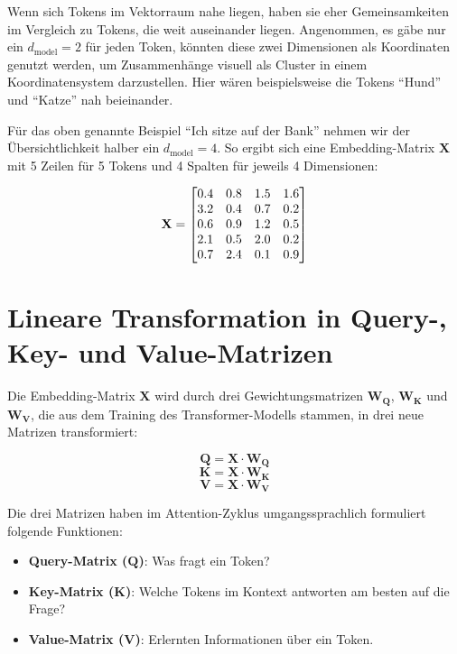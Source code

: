 Wenn sich Tokens im Vektorraum nahe liegen, haben sie eher Gemeinsamkeiten im Vergleich zu Tokens, die weit auseinander liegen.  
Angenommen, es gäbe nur ein \( d_{\text{model}} = 2 \) für jeden Token, könnten diese zwei Dimensionen als Koordinaten genutzt werden, um Zusammenhänge visuell als Cluster in einem Koordinatensystem darzustellen.  
Hier wären beispielsweise die Tokens \enquote{Hund} und \enquote{Katze} nah beieinander.

Für das oben genannte Beispiel \enquote{Ich sitze auf der Bank} nehmen wir der Übersichtlichkeit halber ein \( d_{\text{model}} = 4 \).  
So ergibt sich eine Embedding-Matrix $\mathbf{X}$ mit 5 Zeilen für 5 Tokens und 4 Spalten für jeweils 4 Dimensionen:

\[
\centering
\mathbf{X} =
\begin{bmatrix}
0.4 & 0.8 & 1.5 & 1.6 \\
3.2 & 0.4 & 0.7 & 0.2 \\
0.6 & 0.9 & 1.2 & 0.5 \\
2.1 & 0.5 & 2.0 & 0.2 \\
0.7 & 2.4 & 0.1 & 0.9
\end{bmatrix}
\]

\section{Lineare Transformation in Query-, Key- und Value-Matrizen}

Die Embedding-Matrix $\mathbf{X}$ wird durch drei Gewichtungsmatrizen $\mathbf{W_Q}$, $\mathbf{W_K}$ und $\mathbf{W_V}$, die aus dem Training des Transformer-Modells stammen, in drei neue Matrizen transformiert:

\[
\mathbf{Q} = \mathbf{X} \cdot \mathbf{W_Q}
\]
\[
\mathbf{K} = \mathbf{X} \cdot \mathbf{W_K}
\]
\[
\mathbf{V} = \mathbf{X} \cdot \mathbf{W_V}
\]

Die drei Matrizen haben im Attention-Zyklus umgangssprachlich formuliert folgende Funktionen:

\begin{itemize}
    \item \textbf{Query-Matrix (\(\mathbf{Q}\))}: Was fragt ein Token?
    \item \textbf{Key-Matrix (\(\mathbf{K}\))}: Welche Tokens im Kontext antworten am besten auf die Frage?
    \item \textbf{Value-Matrix (\(\mathbf{V}\))}: Erlernten Informationen über ein Token.
\end{itemize}

